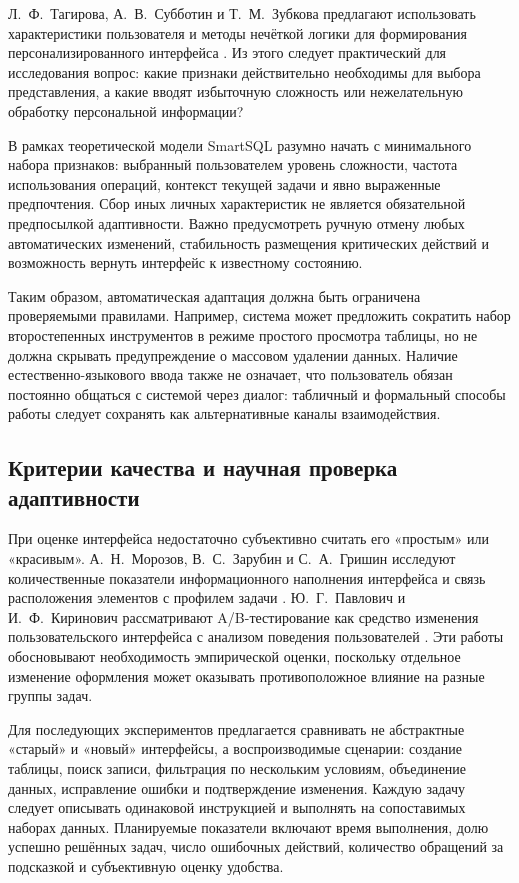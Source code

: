 Л.~Ф.~Тагирова, А.~В.~Субботин и Т.~М.~Зубкова предлагают использовать характеристики пользователя и методы нечёткой логики для формирования персонализированного интерфейса \cite{tagirova2022}. Из этого следует практический для исследования вопрос: какие признаки действительно необходимы для выбора представления, а какие вводят избыточную сложность или нежелательную обработку персональной информации?

В рамках теоретической модели SmartSQL разумно начать с минимального набора признаков: выбранный пользователем уровень сложности, частота использования операций, контекст текущей задачи и явно выраженные предпочтения. Сбор иных личных характеристик не является обязательной предпосылкой адаптивности. Важно предусмотреть ручную отмену любых автоматических изменений, стабильность размещения критических действий и возможность вернуть интерфейс к известному состоянию.

Таким образом, автоматическая адаптация должна быть ограничена проверяемыми правилами. Например, система может предложить сократить набор второстепенных инструментов в режиме простого просмотра таблицы, но не должна скрывать предупреждение о массовом удалении данных. Наличие естественно-языкового ввода также не означает, что пользователь обязан постоянно общаться с системой через диалог: табличный и формальный способы работы следует сохранять как альтернативные каналы взаимодействия.

\subsection{Критерии качества и научная проверка адаптивности}

При оценке интерфейса недостаточно субъективно считать его «простым» или «красивым». А.~Н.~Морозов, В.~С.~Зарубин и С.~А.~Гришин исследуют количественные показатели информационного наполнения интерфейса и связь расположения элементов с профилем задачи \cite{morozov2020}. Ю.~Г.~Павлович и И.~Ф.~Киринович рассматривают A/B-тестирование как средство изменения пользовательского интерфейса с анализом поведения пользователей \cite{pavlovich2021}. Эти работы обосновывают необходимость эмпирической оценки, поскольку отдельное изменение оформления может оказывать противоположное влияние на разные группы задач.

Для последующих экспериментов предлагается сравнивать не абстрактные «старый» и «новый» интерфейсы, а воспроизводимые сценарии: создание таблицы, поиск записи, фильтрация по нескольким условиям, объединение данных, исправление ошибки и подтверждение изменения. Каждую задачу следует описывать одинаковой инструкцией и выполнять на сопоставимых наборах данных. Планируемые показатели включают время выполнения, долю успешно решённых задач, число ошибочных действий, количество обращений за подсказкой и субъективную оценку удобства.

